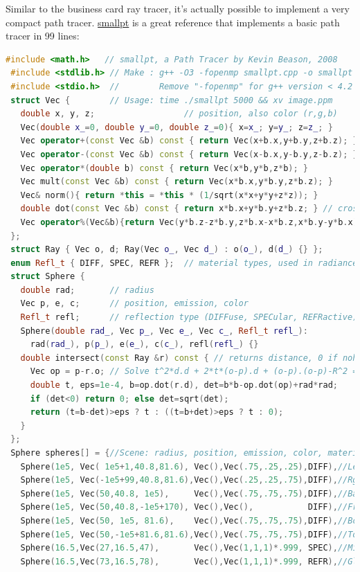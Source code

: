 Similar to the business card ray tracer, it's actually possible to implement a very compact path tracer. \href{http://www.kevinbeason.com/smallpt/}{smallpt} is a great reference that implements a basic path tracer in 99 lines:
\begin{lstlisting}[language=C++]
 #include <math.h>   // smallpt, a Path Tracer by Kevin Beason, 2008 
 #include <stdlib.h> // Make : g++ -O3 -fopenmp smallpt.cpp -o smallpt 
 #include <stdio.h>  //        Remove "-fopenmp" for g++ version < 4.2 
 struct Vec {        // Usage: time ./smallpt 5000 && xv image.ppm 
   double x, y, z;                  // position, also color (r,g,b) 
   Vec(double x_=0, double y_=0, double z_=0){ x=x_; y=y_; z=z_; } 
   Vec operator+(const Vec &b) const { return Vec(x+b.x,y+b.y,z+b.z); } 
   Vec operator-(const Vec &b) const { return Vec(x-b.x,y-b.y,z-b.z); } 
   Vec operator*(double b) const { return Vec(x*b,y*b,z*b); } 
   Vec mult(const Vec &b) const { return Vec(x*b.x,y*b.y,z*b.z); } 
   Vec& norm(){ return *this = *this * (1/sqrt(x*x+y*y+z*z)); } 
   double dot(const Vec &b) const { return x*b.x+y*b.y+z*b.z; } // cross: 
   Vec operator%(Vec&b){return Vec(y*b.z-z*b.y,z*b.x-x*b.z,x*b.y-y*b.x);} 
 }; 
 struct Ray { Vec o, d; Ray(Vec o_, Vec d_) : o(o_), d(d_) {} }; 
 enum Refl_t { DIFF, SPEC, REFR };  // material types, used in radiance() 
 struct Sphere { 
   double rad;       // radius 
   Vec p, e, c;      // position, emission, color 
   Refl_t refl;      // reflection type (DIFFuse, SPECular, REFRactive) 
   Sphere(double rad_, Vec p_, Vec e_, Vec c_, Refl_t refl_): 
     rad(rad_), p(p_), e(e_), c(c_), refl(refl_) {} 
   double intersect(const Ray &r) const { // returns distance, 0 if nohit 
     Vec op = p-r.o; // Solve t^2*d.d + 2*t*(o-p).d + (o-p).(o-p)-R^2 = 0 
     double t, eps=1e-4, b=op.dot(r.d), det=b*b-op.dot(op)+rad*rad; 
     if (det<0) return 0; else det=sqrt(det); 
     return (t=b-det)>eps ? t : ((t=b+det)>eps ? t : 0); 
   } 
 }; 
 Sphere spheres[] = {//Scene: radius, position, emission, color, material 
   Sphere(1e5, Vec( 1e5+1,40.8,81.6), Vec(),Vec(.75,.25,.25),DIFF),//Left 
   Sphere(1e5, Vec(-1e5+99,40.8,81.6),Vec(),Vec(.25,.25,.75),DIFF),//Rght 
   Sphere(1e5, Vec(50,40.8, 1e5),     Vec(),Vec(.75,.75,.75),DIFF),//Back 
   Sphere(1e5, Vec(50,40.8,-1e5+170), Vec(),Vec(),           DIFF),//Frnt 
   Sphere(1e5, Vec(50, 1e5, 81.6),    Vec(),Vec(.75,.75,.75),DIFF),//Botm 
   Sphere(1e5, Vec(50,-1e5+81.6,81.6),Vec(),Vec(.75,.75,.75),DIFF),//Top 
   Sphere(16.5,Vec(27,16.5,47),       Vec(),Vec(1,1,1)*.999, SPEC),//Mirr 
   Sphere(16.5,Vec(73,16.5,78),       Vec(),Vec(1,1,1)*.999, REFR),//Glas 

\end{lstlisting}
